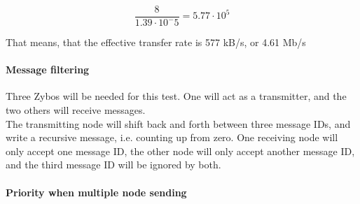 \begin{equation}
\frac{8}{1.39 \cdot 10^-5}= 5.77 \cdot 10^5
\end{equation}

That means, that the effective transfer rate is 577 kB/s, or 4.61 Mb/s

\paragraph{Message filtering}
Three Zybos will be needed for this test.
One will act as a transmitter, and the two others will receive messages.\\
The transmitting node will shift back and forth between three message IDs, and write a recursive message, i.e. counting up from zero.
One receiving node will only accept one message ID, the other node will only accept another message ID, and the third message ID will be ignored by both.


\paragraph{Priority when multiple node sending}